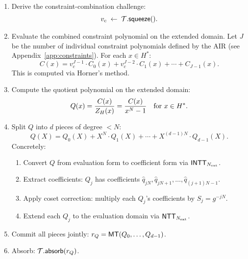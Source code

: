 \begin{enumerate}[label=(\roman*)]
  \item Derive the constraint-combination challenge:
        \[
          v_c \;\leftarrow\; \mathcal{T}.\textsf{squeeze}().
        \]

  \item Evaluate the combined constraint polynomial on the extended domain.
        Let $J$ be the number of individual constraint polynomials
        defined by the AIR (see Appendix~\ref{app:constraints}).
        For each $x \in H^*$:
        \begin{equation}
          \label{eq:constraint}
          C(x) = v_c^{J-1} \cdot C_0(x) + v_c^{J-2} \cdot C_1(x)
                 + \cdots + C_{J-1}(x).
        \end{equation}
        This is computed via Horner's method.

  \item Compute the quotient polynomial on the extended domain:
        \[
          Q(x) = \frac{C(x)}{Z_H(x)} = \frac{C(x)}{x^N - 1}
          \quad \text{for } x \in H^*.
        \]

  \item Split $Q$ into $d$ pieces of degree $< N$:
        \begin{equation}
          \label{eq:quotient-split}
          Q(X) = Q_0(X) + X^N \cdot Q_1(X) + \cdots + X^{(d-1)N} \cdot Q_{d-1}(X).
        \end{equation}
        Concretely:
        \begin{enumerate}[label=(\alph*)]
          \item Convert $Q$ from evaluation form to coefficient form
                via $\textsf{INTT}_{N_{\mathrm{ext}}}$.
          \item Extract coefficients: $Q_j$ has coefficients
                $\hat{q}_{jN}, \hat{q}_{jN+1}, \ldots, \hat{q}_{(j+1)N-1}$.
          \item Apply coset correction: multiply each $Q_j$'s coefficients
                by $S_j = g^{-jN}$.
          \item Extend each $Q_j$ to the evaluation domain via
                $\textsf{NTT}_{N_{\mathrm{ext}}}$.
        \end{enumerate}

  \item Commit all pieces jointly:
        $r_Q = \textsf{MT}(Q_0, \ldots, Q_{d-1})$.

  \item Absorb: $\mathcal{T}.\textsf{absorb}(r_Q)$.
\end{enumerate}


